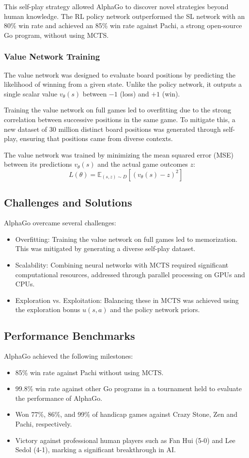 This self-play strategy allowed AlphaGo to discover novel strategies beyond human knowledge. The RL policy network outperformed the SL network with an 80\% win rate and achieved an 85\% win rate against Pachi, a strong open-source Go program, without using MCTS.

\subsubsection{Value Network Training}
The value network was designed to evaluate board positions by predicting the likelihood of winning from a given state. Unlike the policy network, it outputs a single scalar value \( v_\theta(s) \) between \(-1\) (loss) and \(+1\) (win).

Training the value network on full games led to overfitting due to the strong correlation between successive positions in the same game. To mitigate this, a new dataset of 30 million distinct board positions was generated through self-play, ensuring that positions came from diverse contexts.

The value network was trained by minimizing the mean squared error (MSE) between its predictions \( v_\theta(s) \) and the actual game outcomes \( z \):
\[
L(\theta) = \mathbb{E}_{(s, z) \sim D} \left[ (v_\theta(s) - z)^2 \right]
\]
\subsection{Challenges and Solutions}
AlphaGo overcame several challenges:
\begin{itemize}
    \item Overfitting: Training the value network on full games led to memorization. This was mitigated by generating a diverse self-play dataset.
    \item Scalability: Combining neural networks with MCTS required significant computational resources, addressed through parallel processing on GPUs and CPUs.
    \item Exploration vs. Exploitation: Balancing these in MCTS was achieved using the exploration bonus \( u(s, a) \) and the policy network priors.
\end{itemize}

\subsection{Performance Benchmarks}
AlphaGo achieved the following milestones:
\begin{itemize}
    \item 85\% win rate against Pachi without using MCTS.
    \item 99.8\% win rate against other Go programs in a tournament held to evaluate the performance of AlphaGo.
    \item Won 77\%, 86\%, and 99\% of handicap games against Crazy Stone, Zen and Pachi, respectively.
    \item Victory against professional human players such as Fan Hui (5-0) and Lee Sedol (4-1), marking a significant breakthrough in AI.
\end{itemize}


